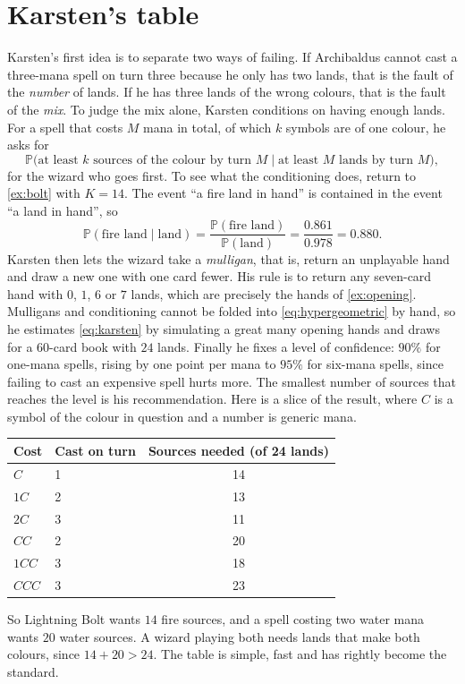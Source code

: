 \documentclass[
    a4paper,
    DIV=13,
    abstract=true,
    numbers=noenddot
]{scrartcl}
\begin{document}
\section{Karsten's table}
Karsten's first idea \cite{karsten2018sources} is to separate two ways of failing. If Archibaldus cannot cast a three-mana spell on turn three because he only has two lands, that is the fault of the \emph{number} of lands. If he has three lands of the wrong colours, that is the fault of the \emph{mix}. To judge the mix alone, Karsten conditions on having enough lands. For a spell that costs $M$ mana in total, of which $k$ symbols are of one colour, he asks for
\begin{equation}\label{eq:karsten}
  \mathbb{P}\bigl(\text{at least } k \text{ sources of the colour by turn } M \;\big|\; \text{at least } M \text{ lands by turn } M\bigr),
\end{equation}
for the wizard who goes first. To see what the conditioning does, return to \cref{ex:bolt} with $K=14$. The event ``a fire land in hand'' is contained in the event ``a land in hand'', so
\[
  \mathbb{P}(\text{fire land}\mid\text{land})=\frac{\mathbb{P}(\text{fire land})}{\mathbb{P}(\text{land})}=\frac{0.861}{0.978}=0.880 .
\]
Karsten then lets the wizard take a \emph{mulligan}, that is, return an unplayable hand and draw a new one with one card fewer. His rule is to return any seven-card hand with $0$, $1$, $6$ or $7$ lands, which are precisely the hands of \cref{ex:opening}. Mulligans and conditioning cannot be folded into \eqref{eq:hypergeometric} by hand, so he estimates \eqref{eq:karsten} by simulating a great many opening hands and draws for a $60$-card book with $24$ lands. Finally he fixes a level of confidence: $90\%$ for one-mana spells, rising by one point per mana to $95\%$ for six-mana spells, since failing to cast an expensive spell hurts more. The smallest number of sources that reaches the level is his recommendation. Here is a slice of the result, where $C$ is a symbol of the colour in question and a number is generic mana.
\begin{center}
\begin{tabular}{llc}
\toprule
Cost & Cast on turn & Sources needed (of 24 lands)\\
\midrule
$C$ & 1 & 14\\
$1C$ & 2 & 13\\
$2C$ & 3 & 11\\
$CC$ & 2 & 20\\
$1CC$ & 3 & 18\\
$CCC$ & 3 & 23\\
\bottomrule
\end{tabular}
\end{center}
So Lightning Bolt wants $14$ fire sources, and a spell costing two water mana wants $20$ water sources. A wizard playing both needs lands that make both colours, since $14+20>24$. The table is simple, fast and has rightly become the standard.
\end{document}

